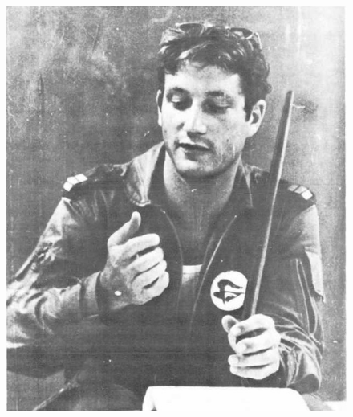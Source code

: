 \begin{figure}[h!tb] 
	\centering\includegraphics[scale=0.6]{History_Yosya/-KYjwfnSX0E.jpg}
\end{figure}

